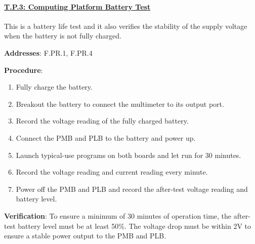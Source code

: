 \paragraph{\underline{T.P.3: Computing Platform Battery Test}}

This is a battery life test and it also verifies the stability of the supply voltage when the battery is not fully charged.

\textbf{Addresses}: F.PR.1, F.PR.4

\textbf{Procedure}:
\begin{enumerate}[noitemsep]
    \item Fully charge the battery.
    \item Breakout the battery to connect the multimeter to its output port.
    \item Record the voltage reading of the fully charged battery. 
    \item Connect the PMB and PLB to the battery and power up.
    \item Launch typical-use programs on both boards and let run for 30 minutes.
    \item Record the voltage reading and current reading every minute.
    \item Power off the PMB and PLB and record the after-test voltage reading and battery level.
\end{enumerate}

\textbf{Verification}: 
To ensure a minimum of 30 minutes of operation time, the after-test battery level must be at least 50\%. The voltage drop must be within 2V to ensure a stable power output to the PMB and PLB.
